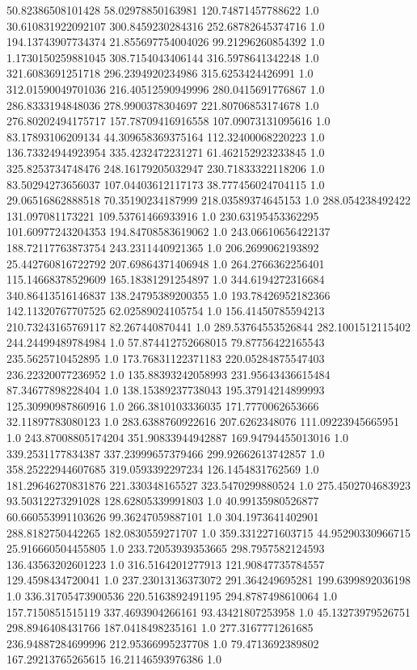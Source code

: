 50.82386508101428	58.02978850163981	120.74871457788622	1.0
30.610831922092107	300.8459230284316	252.68782645374716	1.0
194.13743907734374	21.855697754004026	99.21296260854392	1.0
1.1730150259881045	308.7154043406144	316.5978641342248	1.0
321.6083691251718	296.2394920234986	315.6253424426991	1.0
312.01590049701036	216.40512590949996	280.0415691776867	1.0
286.8333194848036	278.9900378304697	221.80706853174678	1.0
276.80202494175717	157.78709416916558	107.09073131095616	1.0
83.17893106209134	44.309658369375164	112.32400068220223	1.0
136.73324944923954	335.4232472231271	61.462152923233845	1.0
325.8253734748476	248.16179205032947	230.71833322118206	1.0
83.50294273656037	107.04403612117173	38.777456024704115	1.0
29.06516862888518	70.35190234187999	218.03589374645153	1.0
288.054238492422	131.097081173221	109.53761466933916	1.0
230.63195453362295	101.60977243204353	194.84708583619062	1.0
243.06610656422137	188.72117763873754	243.2311440921365	1.0
206.2699062193892	25.442760816722792	207.69864371406948	1.0
264.2766362256401	115.14668378529609	165.18381291254897	1.0
344.6194272316684	340.86413516146837	138.24795389200355	1.0
193.78426952182366	142.11320767707525	62.02589024105754	1.0
156.41450785594213	210.73243165769117	82.267440870441	1.0
289.53764553526844	282.1001512115402	244.24499489784984	1.0
57.874412752668015	79.87756422165543	235.5625710452895	1.0
173.76831122371183	220.05284875547403	236.22320077236952	1.0
135.88393242058993	231.95643436615484	87.34677898228404	1.0
138.15389237738043	195.37914214899993	125.30990987860916	1.0
266.3810103336035	171.7770062653666	32.11897783080123	1.0
283.6388760922616	207.6262348076	111.09223945665951	1.0
243.87008805174204	351.90833944942887	169.94794455013016	1.0
339.2531177834387	337.23999657379466	299.92662613742857	1.0
358.25222944607685	319.0593392297234	126.1454831762569	1.0
181.29646270831876	221.330348165527	323.5470299880524	1.0
275.4502704683923	93.50312273291028	128.62805339991803	1.0
40.99135980526877	60.660553991103626	99.36247059887101	1.0
304.1973641402901	288.8182750442265	182.0830559271707	1.0
359.3312271603715	44.95290330966715	25.916660504455805	1.0
233.72053939353665	298.7957582124593	136.43563202601223	1.0
316.5164201277913	121.90847735784557	129.4598434720041	1.0
237.23013136373072	291.364249695281	199.6399892036198	1.0
336.31705473900536	220.5163892491195	294.8787498610064	1.0
157.7150851515119	337.4693904266161	93.43421807253958	1.0
45.13273979526751	298.8946408431766	187.0418498235161	1.0
277.3167771261685	236.94887284699996	212.95366995237708	1.0
79.4713692389802	167.29213765265615	16.21146593976386	1.0
